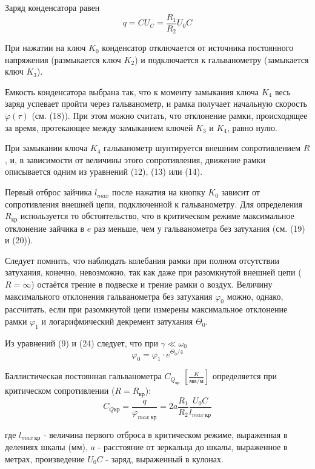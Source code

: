 \documentclass[14pt]{article}
\begin{document}
Заряд конденсатора равен
\begin{equation}
	q = CU_C = \frac{R_1}{R_2}U_0C
\end{equation}

При нажатии на ключ $K_0$ конденсатор отключается от источника постоянного напряжения (размыкается ключ $K_2$) и подключается к гальванометру (замыкается ключ $K_3$).

Емкость конденсатора выбрана так, что к моменту замыкания ключа $K_4$ весь заряд успевает пройти через гальванометр, и рамка получает начальную скорость 
$\dot{\varphi}(\tau)$ (см. (18)). При этом можно считать, что отклонение рамки, происходящее за время, протекающее между замыканием ключей $K_3$ и $K_4$, равно нулю.

При замыкании ключа $K_4$ гальванометр шунтируется внешним сопротивлением $R$, и, в зависимости от величины этого сопротивления, движение рамки описывается одним из уравнений (12), (13) или (14).

Первый отброс зайчика $l_{max}$ после нажатия на кнопку $K_0$ зависит от сопротивления внешней цепи, подключенной к гальванометру. Для определения $R_{\text{кр}}$ используется то обстоятельство, что в критическом режиме максимальное отклонение зайчика в $e$ раз меньше, чем у гальванометра без затухания (см. (19) и (20)).

Следует помнить, что наблюдать колебания рамки при полном отсутствии затухания, конечно, невозможно, так как даже при разомкнутой внешней цепи ($R = \infty$) остаётся трение в подвеске и трение рамки о воздух. Величину максимального отклонения гальванометра без затухания $\varphi_0$ можно, однако, рассчитать, если при разомкнутой цепи измерены максимальное отклонение рамки $\varphi_1$ и логарифмический декремент затухания $\Theta_0$.

Из уравнений (9) и (24) следует, что при $\gamma \ll \omega_0$
\begin{equation}
	\varphi_0 = \varphi_1\cdot e^{\Theta_0/4}
\end{equation}

Баллистическая постоянная гальванометра $C_{Q_{\text{кр}}}$ $\left[\frac{K}{\text{мм}/\text{м}}\right]$ определяется
при критическом сопротивлении ($R = R_{\text{кр}}$):
\begin{equation}
	C_{Q\text{кр}} = \frac{q}{\varphi_{max~\text{кр}}} = 2a\frac{R_1}{R_2}\frac{U_0C}{l_{max~\text{кр}}}
\end{equation}

где $l_{max~\text{кр}}$ - величина первого отброса в критическом режиме, выраженная в делениях шкалы (мм), $a$ - расстояние от зеркальца до шкалы, выраженное в метрах, произведение $U_0C$ - заряд, выраженный в кулонах.
\end{document}
